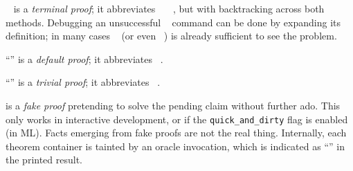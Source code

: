 \begin{isabellebody}
\begin{isamarkuptext}
\begin{description}
  \item \hyperlink{command.by}{\mbox{}}~ is a \emph{terminal
  proof}; it abbreviates \hyperlink{command.proof}{\mbox{}}~~\hyperlink{command.qed}{\mbox{}}~, but with
  backtracking across both methods.  Debugging an unsuccessful
  \hyperlink{command.by}{\mbox{}}~ command can be done by expanding its
  definition; in many cases \hyperlink{command.proof}{\mbox{}}~ (or even
  ~) is already sufficient to see the
  problem.

  \item ``\hyperlink{command.ddot}{\mbox{}}'' is a \emph{default
  proof}; it abbreviates \hyperlink{command.by}{\mbox{}}~.

  \item ``\hyperlink{command.dot}{\mbox{}}'' is a \emph{trivial
  proof}; it abbreviates \hyperlink{command.by}{\mbox{}}~.
  
  \item \hyperlink{command.sorry}{\mbox{}} is a \emph{fake proof}
  pretending to solve the pending claim without further ado.  This
  only works in interactive development, or if the \verb|quick_and_dirty| flag is enabled (in ML).  Facts emerging from fake
  proofs are not the real thing.  Internally, each theorem container
  is tainted by an oracle invocation, which is indicated as ``'' in the printed result.
  

\end{description}
\end{isamarkuptext}
\end{isabellebody}
